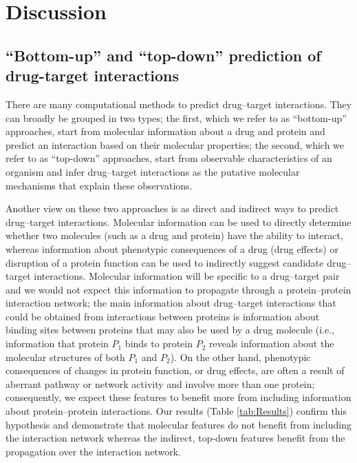 \documentclass{bioinfo}
\begin{document}
\section{Discussion}

\subsection{``Bottom-up'' and ``top-down'' prediction of drug-target interactions}

There are many computational methods to predict drug--target
interactions. They can broadly be grouped in two types; the first,
which we refer to as ``bottom-up'' approaches, start from molecular
information about a drug and protein and predict an interaction based
on their molecular properties; the second, which we refer to as
``top-down'' approaches, start from observable characteristics of an
organism and infer drug--target interactions as the putative molecular
mechanisms that explain these observations.

Another view on these two approaches is as direct and indirect ways to
predict drug--target interactions. Molecular information can be used
to directly determine whether two molecules (such as a drug and
protein) have the ability to interact, whereas information about
phenotypic consequences of a drug (drug effects) or disruption of a
protein function can be used to indirectly suggest candidate
drug--target interactions. Molecular information will be specific to a
drug--target pair and we would not expect this information to
propagate through a protein--protein interaction network; the main
information about drug--target interactions that could be obtained
from interactions between proteins is information about binding sites
between proteins that may also be used by a drug molecule (i.e.,
information that protein $P_1$ binds to protein $P_2$ reveals
information about the molecular structures of both $P_1$ and
$P_2$). On the other hand, phenotypic consequences of changes in
protein function, or drug effects, are often a result of aberrant
pathway or network activity and involve more than one protein;
consequently, we expect these features to benefit more from including
information about protein--protein interactions. Our results (Table
\ref{tab:Results}) confirm this hypothesis and demonstrate that
molecular features do not benefit from including the interaction
network whereas the indirect, top-down features benefit from the
propagation over the interaction network.

\end{document}

